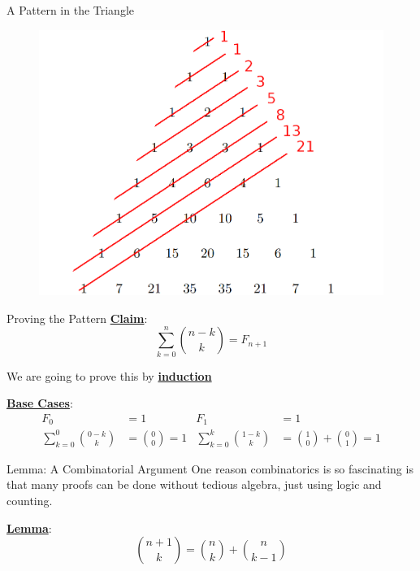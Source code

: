 \documentclass[aspectratio=169]{beamer}
\begin{document}
\begin{frame}{A Pattern in the Triangle}
    \begin{figure}
        \centering
        \includegraphics[scale=1]{images/PascalFib8.png}
    \end{figure}
\end{frame}

\iffalse
\begin{frame}{Proving the Pattern}
    \underline{\textbf{Claim}}: 
    \[
        \sum_{k = 0}^{n} \binom{n - k}{k} = F_{n + 1}
    \]
    
    \vspace{30pt}
    
    \begin{center}
        We are going to prove this by \underline{\textbf{induction}}
    \end{center} \pause
    
    \underline{\textbf{Base Cases}}: 
    \begin{align*}
        F_0 &= 1                                           & F_1 &= 1 \\
        \sum_{k = 0}^0 \binom{0 - k}{k} &= \binom{0}{0} = 1   & \sum_{k = 0}^k \binom{1 - k}{k} &= \binom{1}{0} + \binom{0}{1} = 1
    \end{align*}
\end{frame}

\begin{frame}{Lemma: A Combinatorial Argument}
    One reason combinatorics is so fascinating is that many proofs can be done without tedious algebra, just using logic and counting. \pause
    
    \vspace{40pt}
    
    \underline{\textbf{Lemma}}:
    \[  
        \binom{n + 1}{k} = \binom{n}{k} + \binom{n}{k - 1}
    \]
\end{frame}
\end{document}
